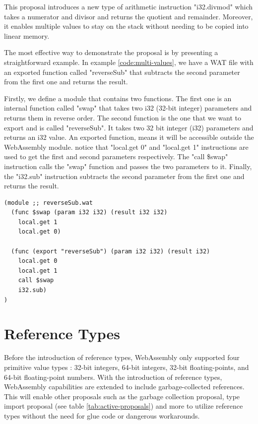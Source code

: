 This proposal introduces a new type of arithmetic instruction "i32.divmod" \cite{fitzgerald_2019_multivalue, webassemblycommunitygroup_2023_webassembly} which takes a numerator and divisor and returns the quotient and remainder. Moreover, it enables multiple values to stay on the stack without needing to be copied into linear memory.

The most effective way to demonstrate the proposal is by presenting a straightforward example. In example \ref{code:multi-values}, we have a WAT file with an exported function called "reverseSub" that subtracts the second parameter from the first one and returns the result. 

Firstly, we define a module that contains two functions. The first one is an internal function called "swap" that takes two i32 (32-bit integer) parameters and returns them in reverse order. The second function is the one that we want to export and is called "reverseSub". It takes two 32 bit integer (i32) parameters and returns an i32 value. An exported function, means it will be accessible outside the WebAssembly module. notice that "local.get 0" and "local.get 1" instructions are used to get the first and second parameters respectively. The "call \$swap" instruction calls the "swap" function and passes the two parameters to it. Finally, the "i32.sub" instruction \cite{webassemblycommunitygroup_2023_webassembly} subtracts the second parameter from the first one and returns the result.

\begin{lstlisting}[frame=lines, style=Wasm, caption={A reverse subtraction function that demonstrates the proposal for returning multiple values}, showstringspaces=false, captionpos=b, label=code:multi-values]
(module ;; reverseSub.wat
  (func $swap (param i32 i32) (result i32 i32)
    local.get 1
    local.get 0)

  (func (export "reverseSub") (param i32 i32) (result i32)
    local.get 0
    local.get 1
    call $swap
    i32.sub)
)
\end{lstlisting}

\section{Reference Types}
\label{sec:reference-types}

Before the introduction of reference types, WebAssembly only supported four primitive value types \cite{webassemblycommunitygroup_2023_webassembly}: 32-bit integers, 64-bit integers, 32-bit floating-points, and 64-bit floating-point numbers. With the introduction of reference types, WebAssembly capabilities are extended to include garbage-collected references. This will enable other proposals \cite{couriol_2020_webassembly} such as the garbage collection proposal, type import proposal (see table \ref{tab:active-proposals}) and more to utilize reference types without the need for glue code or dangerous workarounds. 

